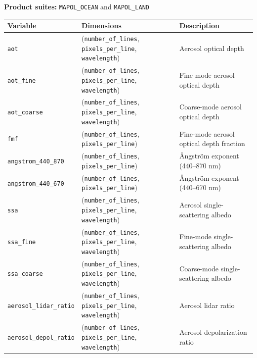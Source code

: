 \documentclass[
  11pt,
  letterpaper,
]{scrreprt}
\begin{document}
\textbf{Product suites:} \texttt{MAPOL\_OCEAN} and \texttt{MAPOL\_LAND}

\begin{longtable}[]{@{}
  >{\raggedright\arraybackslash}p{}
  >{\raggedright\arraybackslash}p{}
  >{\raggedright\arraybackslash}p{}@{}}
\toprule\noalign{}
\begin{minipage}[b]{\linewidth}\raggedright
Variable
\end{minipage} & \begin{minipage}[b]{\linewidth}\raggedright
Dimensions
\end{minipage} & \begin{minipage}[b]{\linewidth}\raggedright
Description
\end{minipage} \\
\midrule\noalign{}
\endhead
\bottomrule\noalign{}
\endlastfoot
\texttt{aot} & (\texttt{number\_of\_lines}, \texttt{pixels\_per\_line},
\texttt{wavelength}) & Aerosol optical depth \\
\texttt{aot\_fine} & (\texttt{number\_of\_lines},
\texttt{pixels\_per\_line}, \texttt{wavelength}) & Fine-mode aerosol
optical depth \\
\texttt{aot\_coarse} & (\texttt{number\_of\_lines},
\texttt{pixels\_per\_line}, \texttt{wavelength}) & Coarse-mode aerosol
optical depth \\
\texttt{fmf} & (\texttt{number\_of\_lines}, \texttt{pixels\_per\_line})
& Fine-mode aerosol optical depth fraction \\
\texttt{angstrom\_440\_870} & (\texttt{number\_of\_lines},
\texttt{pixels\_per\_line}) & Ångström exponent (440--870 nm) \\
\texttt{angstrom\_440\_670} & (\texttt{number\_of\_lines},
\texttt{pixels\_per\_line}) & Ångström exponent (440--670 nm) \\
\texttt{ssa} & (\texttt{number\_of\_lines}, \texttt{pixels\_per\_line},
\texttt{wavelength}) & Aerosol single-scattering albedo \\
\texttt{ssa\_fine} & (\texttt{number\_of\_lines},
\texttt{pixels\_per\_line}, \texttt{wavelength}) & Fine-mode
single-scattering albedo \\
\texttt{ssa\_coarse} & (\texttt{number\_of\_lines},
\texttt{pixels\_per\_line}, \texttt{wavelength}) & Coarse-mode
single-scattering albedo \\
\texttt{aerosol\_lidar\_ratio} & (\texttt{number\_of\_lines},
\texttt{pixels\_per\_line}, \texttt{wavelength}) & Aerosol lidar
ratio \\
\texttt{aerosol\_depol\_ratio} & (\texttt{number\_of\_lines},
\texttt{pixels\_per\_line}, \texttt{wavelength}) & Aerosol
depolarization ratio \\
\end{longtable}
\end{document}
